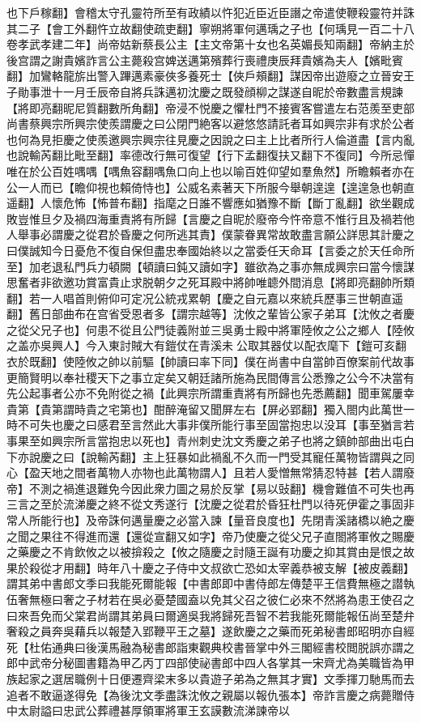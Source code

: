 也下戶稼翻】會稽太守孔靈符所至有政績以忤犯近臣近臣譖之帝遣使鞭殺靈符并誅其二子【會工外翻忤立故翻使疏吏翻】寧朔將軍何邁瑀之子也【何瑀見一百二十八卷孝武孝建二年】尚帝姑新蔡長公主【主文帝第十女也名英媚長知兩翻】帝納主於後宫謂之謝貴嬪詐言公主薨殺宫婢送邁第殯葬行喪禮庚辰拜貴嬪為夫人【嬪毗賓翻】加鸞輅龍旂出警入蹕邁素豪俠多養死士【俠戶頰翻】謀因帝出遊廢之立晉安王子勛事泄十一月壬辰帝自將兵誅邁初沈慶之既發顔柳之謀遂自昵於帝數盡言規諫【將即亮翻昵尼質翻數所角翻】帝浸不悦慶之懼杜門不接賓客嘗遣左右范羨至吏部尚書蔡興宗所興宗使羨謂慶之曰公閉門絶客以避悠悠請託者耳如興宗非有求於公者也何為見拒慶之使羨邀興宗興宗往見慶之因說之曰主上比者所行人倫道盡【言内亂也說輸芮翻比毗至翻】率德改行無可復望【行下孟翻復扶又翻下不復同】今所忌憚唯在於公百姓喁喁【喁魚容翻喁魚口向上也以喻百姓仰望如羣魚然】所瞻賴者亦在公一人而已【瞻仰視也賴倚恃也】公威名素著天下所服今舉朝遑遑【遑遑急也朝直遥翻】人懷危怖【怖普布翻】指麾之日誰不響應如猶豫不斷【斷丁亂翻】欲坐觀成敗豈惟旦夕及禍四海重責將有所歸【言慶之自昵於廢帝今忤帝意不惟行且及禍若他人舉事必謂慶之從君於昏慶之何所逃其責】僕蒙眷異常故敢盡言願公詳思其計慶之曰僕誠知今日憂危不復自保但盡忠奉國始終以之當委任天命耳【言委之於天任命所至】加老退私門兵力頓闕【頓讀曰鈍又讀如字】雖欲為之事亦無成興宗曰當今懷謀思奮者非欲邀功賞富貴止求脱朝夕之死耳殿中將帥唯聼外間消息【將即亮翻帥所類翻】若一人唱首則俯仰可定况公統戎累朝【慶之自元嘉以來統兵歷事三世朝直遥翻】舊日部曲布在宫省受恩者多【謂宗越等】沈攸之輩皆公家子弟耳【沈攸之者慶之從父兄子也】何患不從且公門徒義附並三吳勇士殿中將軍陸攸之公之鄉人【陸攸之盖亦吳興人】今入東討賊大有鎧仗在青溪未公取其器仗以配衣麾下【鎧可亥翻衣於既翻】使陸攸之帥以前驅【帥讀曰率下同】僕在尚書中自當帥百僚案前代故事更簡賢明以奉社稷天下之事立定矣又朝廷諸所施為民間傳言公悉豫之公今不决當有先公起事者公亦不免附從之禍【此興宗所謂重責將有所歸也先悉薦翻】聞車駕屢幸貴第【貴第謂時貴之宅第也】酣醉淹留又聞屏左右【屏必郢翻】獨入閤内此萬世一時不可失也慶之曰感君至言然此大事非僕所能行事至固當抱忠以没耳【事至猶言若事果至如興宗所言當抱忠以死也】青州刺史沈文秀慶之弟子也將之鎮帥部曲出屯白下亦說慶之曰【說輸芮翻】主上狂暴如此禍亂不久而一門受其寵任萬物皆謂與之同心【盈天地之間者萬物人亦物也此萬物謂人】且若人愛憎無常猜忍特甚【若人謂廢帝】不測之禍進退難免今因此衆力圖之易於反掌【易以䜴翻】機會難值不可失也再三言之至於流涕慶之終不從文秀遂行【沈慶之從君於昏狂杜門以待死伊霍之事固非常人所能行也】及帝誅何邁量慶之必當入諫【量音良度也】先閉青溪諸橋以絶之慶之聞之果往不得進而還【還從宣翻又如字】帝乃使慶之從父兄子直閤將軍攸之賜慶之藥慶之不肯飲攸之以被揜殺之【攸之隨慶之討隨王誕有功慶之抑其賞由是恨之故果於殺從才用翻】時年八十慶之子侍中文叔欲亡恐如太宰義恭被支解【被皮義翻】謂其弟中書郎文季曰我能死爾能報【中書郎即中書侍郎左傳楚平王信費無極之譛執伍奢無極曰奢之子材若在吳必憂楚國盍以免其父召之彼仁必來不然將為患王使召之曰來吾免而父棠君尚謂其弟員曰爾適吳我將歸死吾智不若我能死爾能報伍尚至楚弁奢殺之員奔吳藉兵以報楚入郢鞭平王之墓】遂飲慶之之藥而死弟秘書郎昭明亦自經死【杜佑通典曰後漢馬融為秘書郎詣東觀典校書晉掌中外三閣經書校閲脱誤亦謂之郎中武帝分秘圖書籍為甲乙丙丁四部使祕書郎中四人各掌其一宋齊尤為美職皆為甲族起家之選居職例十日便遷齊梁末多以貴遊子弟為之無其才實】文季揮刀馳馬而去追者不敢逼遂得免【為後沈文季盡誅沈攸之親屬以報仇張本】帝詐言慶之病薨贈侍中太尉謚曰忠武公葬禮甚厚領軍將軍王玄謨數流涕諫帝以